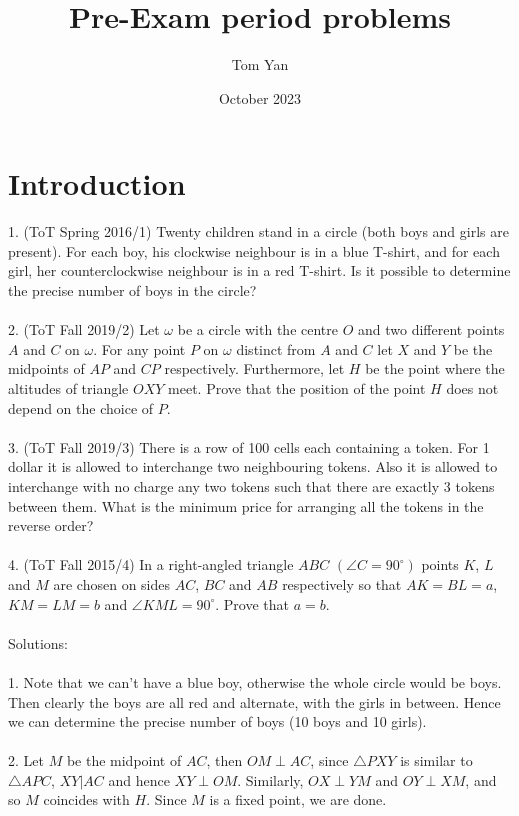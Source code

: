 \documentclass{article}
\title{Pre-Exam period problems}
\author{Tom Yan}
\date{October 2023}
\begin{document}
\maketitle

\section{Introduction}
1. (ToT Spring 2016/1) Twenty children stand in a circle (both boys and girls are present). For each boy, his clockwise neighbour is in a blue T-shirt, and for each girl, her counterclockwise neighbour is in a red T-shirt. Is it possible to determine the precise number of boys in the circle? \\\\
2. (ToT Fall 2019/2) Let $\omega$ be a circle with the centre $O$ and two different points $A$ and $C$ on $\omega$. For any point $P$ on $\omega$ distinct from $A$ and $C$ let $X$ and $Y$ be the midpoints of $AP$ and
$CP$ respectively. Furthermore, let $H$ be the point where the altitudes of triangle $OXY$ meet. Prove that the position of the point $H$ does not depend on the choice of $P$. \\\\
3. (ToT Fall 2019/3) There is a row of 100 cells each containing a token. For 1 dollar it
is allowed to interchange two neighbouring tokens. Also it is allowed
to interchange with no charge any two tokens such that there are
exactly 3 tokens between them. What is the minimum price for
arranging all the tokens in the reverse order? \\\\
4. (ToT Fall 2015/4) In a right-angled triangle $ABC$ $(\angle C = 90^{\circ})$ points $K$, $L$ and $M$ are chosen on sides $AC$, $BC$ and $AB$ respectively so that $AK = BL = a$, $KM = LM = b$ and $∠KML = 90^{\circ}$. Prove that $a = b$. \\\\
\newpage
Solutions: \\\\
1. Note that we can't have a blue boy, otherwise the whole circle would be boys. Then clearly the boys are all red and alternate, with the girls in between. Hence we can determine the precise number of boys (10 boys and 10 girls). \\\\
2. Let $M$ be the midpoint of $AC$, then $OM \perp AC$, since $\triangle PXY$ is similar to $\triangle APC$, $XY | AC$ and hence $XY \perp OM$. Similarly, $OX \perp YM$ and $OY \perp XM$, and so $M$ coincides with $H$. Since $M$ is a fixed point, we are done. \\\\\
\end{document}
